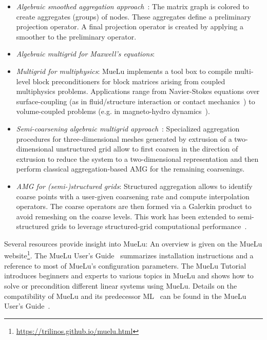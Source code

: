 \begin{itemize}
\item \emph{Algebraic smoothed aggregation approach}~\cite{Vanek1996a}:
The matrix graph is colored to create aggregates (groups) of nodes.
These aggregates define a preliminary projection operator.
A final projection operator is created by applying a smoother to the preliminary operator.

\item \emph{Algebraic multigrid for Maxwell’s equations}:

\item \emph{Multigrid for multiphysics}:
MueLu implements a tool box to compile multi-level block preconditioners for block matrices arising from coupled multiphysics problems.
Applications range from Navier-Stokes equations
over surface-coupling (as in fluid/structure interaction or contact mechanics~\cite{Wiesner2021a})
to volume-coupled problems (e.g. in magneto-hydro dynamics~\cite{Ohm2022a}).


\item \emph{Semi-coarsening algebraic multigrid approach}~:
Specialized aggregation procedures for three-dimensional meshes generated by extrusion of a two-dimensional unstructured grid
allow to first coarsen in the direction of extrusion to reduce the system to a two-dimensional representation and then perform classical aggregation-based AMG
for the remaining coarsenings.

\item \emph{AMG for (semi-)structured grids}:
Structured aggregation allows to identify coarse points with a user-given coarsening rate and compute interpolation operators.
The coarse operators are then formed via a Galerkin product to avoid remeshing on the coarse levels.
This work has been extended to semi-structured grids to leverage structured-grid computational performance~\cite{Mayr2022a}.

\end{itemize}

Several resources provide insight into MueLu:
An overview is given on the MueLu website\footnote{\url{https://trilinos.github.io/muelu.html}}.
The MueLu User's Guide~\cite{BergerVergiat2023a} summarizes installation instructions and a reference to most of MueLu's configuration parameters.
The MueLu Tutorial~\cite{Mayr2023b} introduces beginners and experts to various topics in MueLu and shows how to solve or precondition different linear systems using MueLu.
Details on the compatibility of MueLu and its predecessor ML~\cite{Heroux2005a,Gee2006a} can be found in the MueLu User's Guide~\cite{BergerVergiat2023a}.

